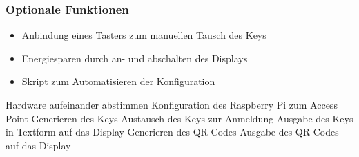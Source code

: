 \documentclass[a4paper,11pt,singlespacing]{article}
\begin{document}
			\subsubsection{Optionale Funktionen}
			\begin{itemize}
				\item Anbindung eines Tasters zum manuellen Tausch des Keys 
				\item Energiesparen durch an- und abschalten des Displays
				\item Skript zum Automatisieren der Konfiguration
			\end{itemize}


Hardware aufeinander abstimmen 
Konfiguration des Raspberry Pi zum Access Point
Generieren des Keys
Austausch des Keys zur Anmeldung
Ausgabe des Keys in Textform auf das Display
Generieren des QR-Codes
Ausgabe des QR-Codes auf das Display
\end{document}
